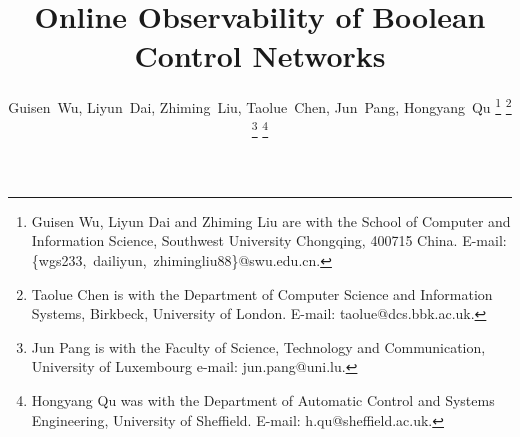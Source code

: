 \documentclass[journal]{IEEEtran}
\begin{document}
\title{Online Observability of Boolean Control Networks}
\author{Guisen~Wu,
	Liyun~Dai\Envelope,
	Zhiming~Liu,
	Taolue~Chen,
	Jun~Pang,
	Hongyang~Qu
	\thanks{Guisen Wu, Liyun Dai and Zhiming Liu are with the School of Computer and Information Science, Southwest University
Chongqing, 400715 China. E-mail: \{wgs233,~dailiyun,~zhimingliu88\}@swu.edu.cn.}
	 \thanks{Taolue Chen is with the Department of Computer Science and Information Systems, Birkbeck, University of London. E-mail: taolue@dcs.bbk.ac.uk.}
	 \thanks{Jun Pang is with the Faculty of Science, Technology and Communication, University of Luxembourg e-mail: jun.pang@uni.lu.}
	 \thanks{Hongyang Qu was with the Department of Automatic Control and Systems Engineering, University of Sheffield. E-mail: h.qu@sheffield.ac.uk.}
}
% 
%



% 
\end{document}
